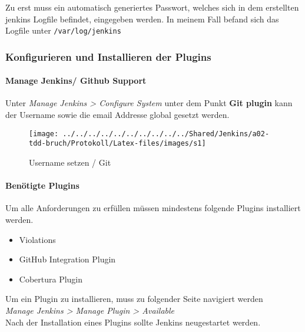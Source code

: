Zu erst muss ein automatisch generiertes Passwort, welches sich in dem erstellten jenkins Logfile befindet, eingegeben werden. In meinem Fall befand sich das Logfile unter \texttt{/var/log/jenkins}

\subsubsection{Konfigurieren und Installieren der Plugins}
\paragraph{Manage Jenkins/ Github Support}\mbox{}
\vspace{0.16cm}

Unter \textit{Manage Jenkins > Configure System} unter dem Punkt \textbf{Git plugin} kann der Username sowie die email Addresse global gesetzt werden.
\begin{figure}[!h]
\centering
\texttt{[image: ../../../../../../../../../../Shared/Jenkins/a02-tdd-bruch/Protokoll/Latex-files/images/s1]}
\caption{Username setzen / Git}
\label{fig:s1}
\end{figure}

\paragraph{Benötigte Plugins}\mbox{}
\vspace{0.16cm}

Um alle Anforderungen zu erfüllen müssen mindestens folgende Plugins installiert werden.
\begin{itemize}
	\item Violations
	\item GitHub Integration Plugin
	\item Cobertura Plugin
\end{itemize}

Um ein Plugin zu installieren, muss zu folgender Seite navigiert werden\\ \textit{Manage Jenkins > Manage Plugin > Available}\\
Nach der Installation eines Plugins sollte Jenkins neugestartet werden.

